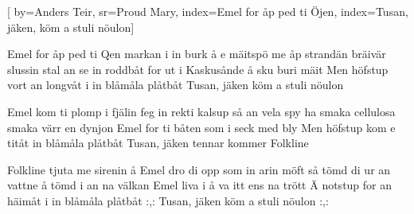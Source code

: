 

[ 		%
	by={Anders Teir},					%
	sr={Proud Mary},					%
	index={Emel for åp ped ti Öjen}, 						%
	index={Tusan, jäken, köm a stuli nöulon}]						%
	

\beginverse*						%
Emel for åp ped ti Qen
markan i in burk å e mäitspö me
åp strandän bräivär slussin
stal an se in roddbåt
for ut i Kaskusånde å sku buri mäit
Men höfstup vort an longvåt
i in blåmåla plåtbåt
Tusan, jäken
köm a stuli nöulon
\endverse							%

\beginverse*						%
Emel kom ti plomp i fjälin
feg in rekti kalsup så an vela spy
ha smaka cellulosa
smaka värr en dynjon
Emel for ti båten som i seck med bly
Men höfstup kom e titåt
in blåmåla plåtbåt
Tusan, jäken
tennar kommer Folkline
\endverse							%

\beginverse*						%
Folkline tjuta me sirenin
å Emel dro di opp som in arin möft
så tömd di ur an vattne
å tömd i an na välkan
Emel liva i å va itt ens na trött
Ä notstup for an häimåt
i in blåmåla plåtbåt
:,: Tusan, jäken
köm a stuli nöulon :,:
\endverse							%


\endsong							%

